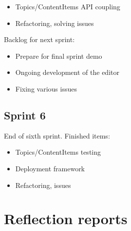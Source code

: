 \documentclass[10pt,a4paper]{article}
\begin{document}
\begin{appendices}
{        \begin{itemize}
          \item Topics/ContentItems API coupling
          \item Refactoring, solving issues
        \end{itemize}

        Backlog for next sprint:

        \begin{itemize}
          \item Prepare for final sprint demo
          \item Ongoing development of the editor
          \item Fixing various issues
        \end{itemize}

      \subsection*{Sprint 6}
        End of sixth sprint. Finished items:
        
        \begin{itemize}
          \item Topics/ContentItems testing
          \item Deployment framework
          \item Refactoring, issues
        \end{itemize}
    }

    \section{Reflection reports}
    
    
    
    
  \end{appendices}
\end{document}
